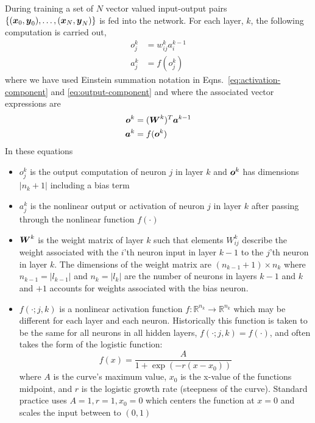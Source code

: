 \documentclass[12pt,notitlepage]{article}
\begin{document}
During training a set of $N$ vector valued input-output pairs $\{(\boldsymbol{x}_{0},\boldsymbol{y}_{0}), \dots,
(\boldsymbol{x}_{N},\boldsymbol{y}_{N})\}$ is fed into the network.  For each layer, $k$, the
following computation is carried out,
\begin{align}
  \label{eq:activation-component}
  o_{j}^{k} &= w_{ij}^{k}a_{i}^{k-1}\\
  \label{eq:output-component}
  a_{j}^{k} &= f( o_{j}^{k})  
\end{align}
where we have used Einstein summation notation in
Eqns.~\ref{eq:activation-component} and \ref{eq:output-component} and
where the associated vector expressions are
\begin{align}
  \label{eq:activation-matrix}
  \boldsymbol{o}^{k} &= (\boldsymbol{W}^{k})^{T}\boldsymbol{a}^{k-1}\\
  \label{eq:output-matrix}
  \boldsymbol{a}^{k} &= f(\boldsymbol{o}^{k})
\end{align}
In these equations
\begin{itemize}
\item $o_{j}^{k}$ is the output computation of neuron $j$ in layer $k$
  and $\boldsymbol{o}^{k}$ has dimensions $|n_{k}+1|$ including a bias term
\item $a_{j}^{k}$ is the nonlinear output or activation of neuron $j$ in layer $k$ after
  passing through the nonlinear function $f(\cdot)$
\item $\boldsymbol{W}^{k}$ is the weight matrix of layer $k$ such that
  elements $W_{ij}^{k}$ describe the weight associated with the $i$'th
  neuron input in layer $k-1$ to the $j$'th neuron in layer $k$.
  The dimensions of the weight matrix are $( n_{k-1} + 1 ) \times
  n_{k}$ where $n_{k-1} = |l_{k-1}|$ and $n_{k}
  = |l_{k}|$ are the number of neurons in layers $k-1$ and $k$ and
  $+1$ accounts for weights associated with the bias neuron.
\item $f(\cdot;j,k)$ is a nonlinear activation function $f: \mathbb{R}^{n_{k}} \to
  \mathbb{R}^{n_{k}}$ which may be different for each layer and each neuron.  Historically
  this function is taken to be the same for all neurons in all hidden
  layers,
  $f( \cdot; j,k ) = f( \cdot )$, and often takes the form of the
  logistic function:
  \begin{equation}
    \label{eq:logistic-fun}
    f(x) = \frac{A}{1+\exp(-r(x-x_{0}))}
  \end{equation}
  where $A$ is the curve's maximum value, $x_{0}$ is the x-value of
  the functions midpoint, and $r$ is the logistic growth rate
  (steepness of the curve).  Standard practice uses $A=1, r=1, x_{0} =
  0$ which centers the function at $x=0$ and scales the input between
  to $(0,1)$
\end{itemize}
\end{document}
